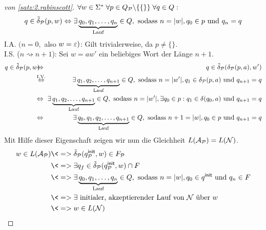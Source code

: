 {\begin{proof}[von \autoref{satz:2.rabinscott}]
        $\forall w\in\Sigma^*\; \forall p\in Q_{\mathcal{P}}\backslash\{\{\}\}\; \forall q\in Q:$
        $$q\in\tilde\delta_{\mathcal{P}}(p,w) \Leftrightarrow \exists \underbrace{q_0, q_1,\ldots, q_n}_{\text{Lauf}}\in Q, \text{ sodass }  n=|w|, q_0\in p \text{ und } q_n=q$$
        I.A. $(n=0,$ also $w=\varepsilon)$: Gilt trivialerweise, da $p\neq\{\}$.\\
        I.S. ($n\rightsquigarrow n+1$): Sei $w=aw'$ ein beliebiges Wort der Länge $n+1$.
        \begin{eqnarray*}
                q\in\tilde\delta_\calP(p,w) 
                \hspace*{-2.5mm} & \Leftrightarrow & \hspace*{-2.5mm} q\in\tilde\delta_\calP(\delta_\calP(p,a),w')\\
                & \stackrel{\text{I.V.}}{\Leftrightarrow} & \hspace*{-2.5mm} \exists\underbrace{q_1,q_2,\ldots, q_{n+1}}_{\text{Lauf}}\in Q, \text{ sodass }  n=|w'|, q_1\in \delta_\calP(p,a) \text{ und } q_{n+1}=q\\
                & \Leftrightarrow & \hspace*{-2.5mm}\exists\underbrace{q_1,q_2,\ldots, q_{n+1}}_{\text{Lauf}}\in Q, \text{ sodass }  n=|w'|, \exists q_0\in p: q_1\in\delta(q_0,a) \text{ und } q_{n+1}=q\\
                & \Leftrightarrow & \hspace*{-2.5mm} \exists\underbrace{q_0,q_1,q_2,\ldots, q_{n+1}}_{\text{Lauf}}\in Q,\text{ sodass }  n+1=|w|, q_0\in p \text{ und } q_{n+1}=q
        \end{eqnarray*}
        Mit Hilfe dieser Eigenschaft zeigen wir nun die Gleichheit $L(\mathcal{A}_{\mathcal{P}})=L(\mathcal{N})$.
        \begin{align*}
         w\in L(\A_\calP) 
         &\<=> \tilde\delta_\calP(\qinit_\calP,w)\in F_\calP\\
         &\<=> \exists q_f\in \tilde\delta_\calP(\qinit_\calP,w)\cap F\\
         &\<=> \exists \underbrace{q_0, q_1,\ldots, q_n}_{\text{Lauf}}\in Q, \text{ sodass }  n=|w|, q_0\in \qinit \text{ und } q_n\in F\\
         &\<=> \exists \text{ initialer, akzeptierender Lauf von $\calN$ über $w$} \\
         &\<=> w\in L(\calN)
         \qedhere
        \end{align*}
\end{proof}

}

